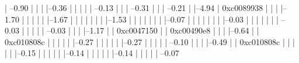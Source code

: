             |                      --0.90%
            |                                |          
            |                                |--0.36%
            |                                |          |          
            |                                |           --0.13%
            |                                |          
            |                                 --0.31%
            |                                           |          
            |                                            --0.21%
            |          
            |--4.94%
            |          0xc0089938
            |          |          
            |          |--1.70%
            |          |          |          
            |          |          |--1.67%
            |          |          |          |          
            |          |          |          |--1.53%
            |          |          |          |          
            |          |          |          |--0.07%
            |          |          |          |          
            |          |          |          |--0.03%
            |          |          |          |          
            |          |          |           --0.03%
            |          |          |          
            |          |           --0.03%
            |          |          
            |          |--1.17%
            |          |          0xc0047150
            |          |          0xc00490e8
            |          |          
            |          |--0.64%
            |          |          0xc010808c
            |          |          |          
            |          |          |--0.27%
            |          |          |          
            |          |          |--0.27%
            |          |          |          
            |          |           --0.10%
            |          |          
            |          |--0.49%
            |          |          0xc010808c
            |          |          |          
            |          |          |--0.15%
            |          |          |          
            |          |          |--0.14%
            |          |          |          
            |          |          |--0.14%
            |          |          |          
            |          |           --0.07%
